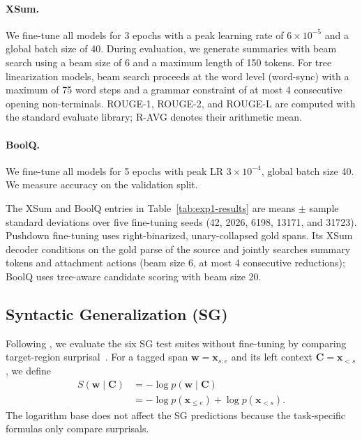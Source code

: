 \documentclass[11pt]{article}
\begin{document}
\paragraph{XSum.} We fine-tune all models for 3 epochs with a peak learning rate of $6\times10^{-5}$ and a global batch size of 40.
During evaluation, we generate summaries with beam search using a beam size of 6 and a maximum length of 150 tokens.
For tree linearization models, beam search proceeds at the word level (word-sync) with a maximum of 75 word steps and a grammar constraint of at most 4 consecutive opening non-terminals.
ROUGE-1, ROUGE-2, and ROUGE-L are computed with the standard evaluate library; R-AVG denotes their arithmetic mean.

\paragraph{BoolQ.} We fine-tune all models for 5 epochs with peak LR $3\times10^{-4}$, global batch size 40.
We measure accuracy on the validation split.

The XSum and BoolQ entries in Table~\ref{tab:exp1-results} are means $\pm$ sample standard deviations over five fine-tuning seeds (42, 2026, 6198, 13171, and 31723). Pushdown fine-tuning uses right-binarized, unary-collapsed gold spans. Its XSum decoder conditions on the gold parse of the source and jointly searches summary tokens and attachment actions (beam size 6, at most 4 consecutive reductions); BoolQ uses tree-aware candidate scoring with beam size 20.

\subsection{Syntactic Generalization (SG)}
\label{sec:sg-eval-setup}
Following \citet{hu-etal-2020-systematic}, we evaluate the six SG test suites without fine-tuning by comparing target-region surprisal~\cite{hale-2001-probabilistic}.
For a tagged span $\mathbf{w}=\mathbf{x}_{s:e}$ and its left context $\mathbf{C}=\mathbf{x}_{<s}$, we define
\[
\begin{aligned}
S(\mathbf{w}\mid\mathbf{C})
  &= -\log p(\mathbf{w}\mid\mathbf{C}) \\
  &= -\log p(\mathbf{x}_{\leq e})+\log p(\mathbf{x}_{<s}).
\end{aligned}
\]
The logarithm base does not affect the SG predictions because the task-specific formulas only compare surprisals.
\end{document}
